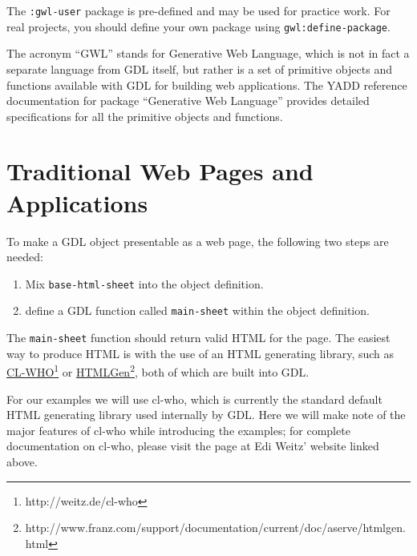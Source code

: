 \documentclass [11pt]{book}
\begin{document}
The \texttt{:gwl-user} package is pre-defined and may be used for practice
work. For real projects, you should define your own package using \texttt{gwl:define-package}.



The acronym ``GWL'' stands for Generative Web Language,
which is not in fact a separate language from GDL itself, but rather
is a set of primitive objects and functions available with GDL for
building web applications. The YADD reference documentation for
package ``Generative Web Language'' provides detailed specifications
for all the primitive objects and functions.



\section{Traditional Web Pages and Applications}

\label{sec:traditionalwebpagesandapplications}



To make a GDL object presentable as a web page, the following two
steps are needed:

\begin{enumerate}

\item Mix \texttt{base-html-sheet} into the object definition.

\item define a GDL function called \texttt{main-sheet} within the object definition.

\end{enumerate}

The \texttt{main-sheet} function should return valid
HTML for the page. The easiest way to produce HTML is with the use of
an HTML generating library, such as \href{http://weitz.de/cl-who}{CL-WHO}\footnote{http://weitz.de/cl-who} or \href{http://www.franz.com/support/documentation/current/doc/aserve/htmlgen.html}{HTMLGen}\footnote{http://www.franz.com/support/documentation/current/doc/aserve/htmlgen.html}, both of which are built into GDL.



For our examples we will use cl-who, which is currently the
standard default HTML generating library used internally by
GDL. Here we will make note of the major features of cl-who while
introducing the examples; for complete documentation on cl-who, please
visit the page at Edi Weitz' website linked above.
\end{document}
